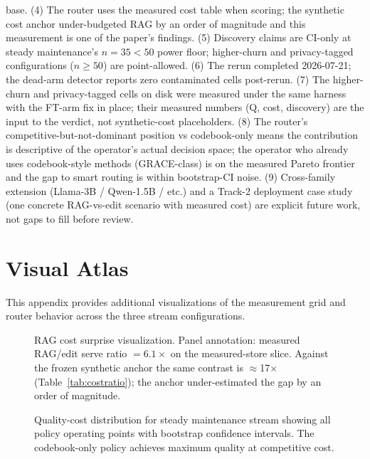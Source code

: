 \documentclass[preprint,12pt]{elsarticle}
\begin{document}
base. (4) The router uses the measured cost
table when scoring; the synthetic cost anchor under-budgeted RAG by an order of
magnitude and this measurement is one of the paper's findings. (5) Discovery
claims are CI-only at steady maintenance's $n = 35 < 50$ power floor; higher-churn and privacy-tagged configurations ($n \ge 50$)
are point-allowed. (6) The rerun completed 2026-07-21; the dead-arm
detector reports zero contaminated cells post-rerun. (7) The higher-churn and privacy-tagged cells on
disk were measured under the same harness with the FT-arm fix in place; their
measured numbers (Q, cost, discovery) are the input to the verdict, not
synthetic-cost placeholders. (8) The router's competitive-but-not-dominant
position vs codebook-only means the contribution is descriptive of the
operator's actual decision space; the operator who already uses codebook-style
methods (GRACE-class) is on the measured Pareto frontier and the gap to smart
routing is within bootstrap-CI noise. (9) Cross-family extension (Llama-3B /
Qwen-1.5B / etc.) and a Track-2 deployment case study (one concrete RAG-vs-edit
scenario with measured cost) are explicit future work, not gaps to fill before
review.

\appendix
\section{Visual Atlas}
\label{app:visual}

This appendix provides additional visualizations of the measurement grid and router
behavior across the three stream configurations.

\begin{figure}[!ht]
\centering

\caption{RAG cost surprise visualization. Panel annotation: measured RAG/edit
serve ratio $=6.1\times$ on the measured-store slice. Against the frozen synthetic
anchor the same contrast is $\approx$17$\times$ (Table~\ref{tab:costratio}); the
anchor under-estimated the gap by an order of magnitude.}
\label{fig:ragcost-app}
\end{figure}

\begin{figure}[!ht]
\centering

\caption{Quality-cost distribution for steady maintenance stream showing all policy
operating points with bootstrap confidence intervals. The codebook-only policy
achieves maximum quality at competitive cost.}
\label{fig:steady-spread-app}
\end{figure}
\end{document}
